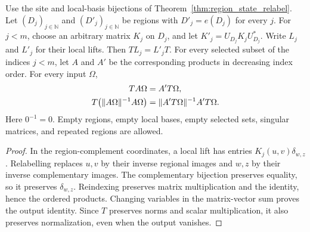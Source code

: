 \begin{theorem}
    \label{thm:filter_output_relabel}
    \leanok
    Use the site and local-basis bijections of
    Theorem~\ref{thm:region_state_relabel}. Let $(D_j)_{j\in\mathbb N}$
    and $(D'_j)_{j\in\mathbb N}$ be regions with $D'_j=e(D_j)$ for every
    $j$. For $j<m$, choose an arbitrary matrix $K_j$ on $D_j$, and let
    $K'_j=U_{D_j}K_jU_{D_j}^*$. Write $L_j$ and $L'_j$ for their local
    lifts. Then $TL_j=L'_jT$. For every selected subset of the indices
    $j<m$, let $A$ and $A'$ be the corresponding products in decreasing
    index order. For every input $\Omega$,
    \begin{align}
        TA\Omega & =A'T\Omega,\notag                   \\
        T\bigl(\|A\Omega\|^{-1}A\Omega\bigr)
                 & =\|A'T\Omega\|^{-1}A'T\Omega.\notag
    \end{align}
    Here $0^{-1}=0$. Empty regions, empty local bases, empty selected
    sets, singular matrices, and repeated regions are allowed.
\end{theorem}
\begin{proof}
    \leanok
    In the region-complement coordinates, a local lift has entries
    $K_j(u,v)\delta_{w,z}$. Relabelling replaces $u,v$ by their inverse
    regional images and $w,z$ by their inverse complementary images.
    The complementary bijection preserves equality, so it preserves
    $\delta_{w,z}$. Reindexing preserves matrix multiplication and the
    identity, hence the ordered products. Changing variables in the
    matrix-vector sum proves the output identity. Since $T$ preserves
    norms and scalar multiplication, it also preserves normalization,
    even when the output vanishes.
\end{proof}

